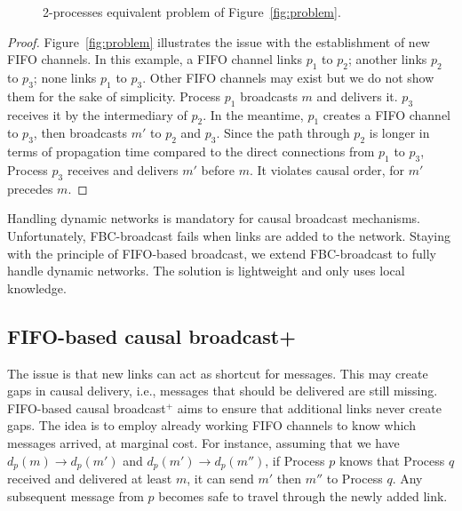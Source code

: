 \begin{figure}
  \begin{center}
    
    \caption{\label{fig:eq2problem}2-processes equivalent problem of
      Figure~\ref{fig:problem}.}
  \end{center}
\end{figure}

\begin{proof}
  Figure~\ref{fig:problem} illustrates the issue with the establishment of new
  FIFO channels. In this example, a FIFO channel links $p_1$ to $p_2$; another
  links $p_2$ to $p_3$; none links $p_1$ to $p_3$. Other FIFO channels may exist
  but we do not show them for the sake of simplicity. Process $p_1$ broadcasts
  $m$ and delivers it. $p_3$ receives it by the intermediary of $p_2$. In the
  meantime, $p_1$ creates a FIFO channel to $p_3$, then broadcasts $m'$ to $p_2$
  and $p_3$. Since the path through $p_2$ is longer in terms of propagation time
  compared to the direct connections from $p_1$ to $p_3$, Process $p_3$ receives
  and delivers $m'$ before $m$. It violates causal order, for $m'$ precedes $m$.
\end{proof}

Handling dynamic networks is mandatory for causal broadcast
mechanisms. Unfortunately, FBC-broadcast fails when links are added to the
network. Staying with the principle of FIFO-based broadcast, we extend
FBC-broadcast to fully handle dynamic networks. The solution is lightweight and
only uses local knowledge.

\subsection{FIFO-based causal broadcast+}
\label{subsec:bufferbroadcast}

The issue is that new links can act as shortcut for messages. This may create
gaps in causal delivery, i.e., messages that should be delivered are still
missing.  FIFO-based causal broadcast$^+$ aims to ensure that additional links
never create gaps. The idea is to employ already working FIFO channels to know
which messages arrived, at marginal cost. For instance, assuming that we have
$d_p(m) \rightarrow d_p(m')$ and $d_p(m') \rightarrow d_p(m'')$, if Process $p$
knows that Process $q$ received and delivered at least $m$, it can send $m'$
then $m''$ to Process $q$. Any subsequent message from $p$ becomes safe to
travel through the newly added link.



